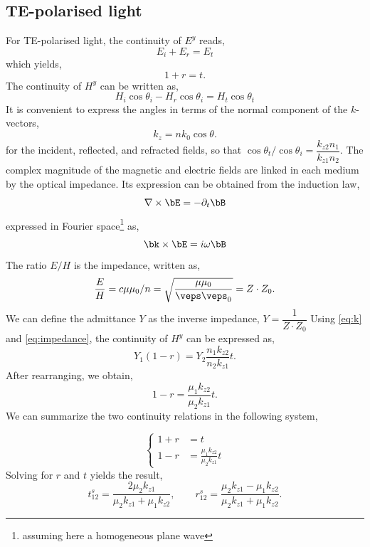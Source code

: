 \documentclass[a4paper,11pt]{article}
\begin{document}
\subsection{TE-polarised light} %
\label{sub:te_polarised_light}
For TE-polarised light, the continuity of $E^y$ reads,
\[
E_i + E_r  = E_t
\]
which yields,
\begin{equation}
	1+r =t.
\label{eq:rt1}
\end{equation}
The continuity of $H^y$ can be written as,
\[
H_i\cos\theta_i - H_r\cos\theta_i  = H_t\cos\theta_t
\]
It is convenient to express the angles in terms of the normal component of the $k$-vectors,
\begin{equation}
	k_z = n k_0 \cos\theta.
\label{eq:k}
\end{equation}
for the incident, reflected, and refracted fields, so that $\cos\theta_t / \cos\theta_i=\dfrac{k_{z2}n_1}{k_{z1}n_2}$. The complex magnitude of the magnetic and electric fields are linked in each medium by the optical impedance. Its expression can be obtained from the induction law,
\[
\nabla\times \bE = -\partial_t \bB
\]
expressed in Fourier space\footnote{assuming here a homogeneous plane wave} as,
\[
\bk\times \bE = i\omega \bB
\]
The ratio $E/H$ is the impedance, written as,
\begin{equation}
	\frac{E}{H}= c \mu \mu_0 / n= \sqrt{\frac{\mu\mu_0}{\veps\veps_0}}=Z\cdot Z_0.
\label{eq:impedance}
\end{equation}
We can define the admittance $Y$ as the inverse impedance, $Y=\dfrac{1}{Z\cdot Z_0}$
Using \ref{eq:k} and \ref{eq:impedance}, the continuity of $H^y$ can be expressed as,
\[
Y_1 (1 - r) =  Y_2 \frac{n_1k_{z2}}{n_2k_{z1}}t.
\]
After rearranging, we obtain,
\begin{equation}
	1 - r = \frac{\mu_1k_{z2}}{\mu_2k_{z1}}t.
\label{eq:rt2}
\end{equation}
We can summarize the two continuity relations in the following system,

\begin{equation*} \left\{
\begin{aligned}
1 + r &= t\\
1 - r &= \frac{\mu_1k_{z2}}{\mu_2k_{z1}}t
\end{aligned}\right.
\end{equation*}
Solving for $r$ and $t$ yields the result,
\begin{equation} 
t_{12}^s=\frac{2\mu_2 k_{z1}}{\mu_2 k_{z1}+\mu_1k_{z2}},\qquad r_{12}^s=\frac{\mu_2 k_{z1}-\mu_1k_{z2}}{\mu_2 k_{z1}+\mu_1k_{z2}}.
\label{eq:fresnels}
\end{equation}
\end{document}
